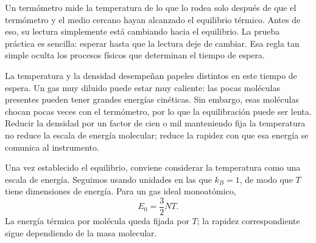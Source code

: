 Un termómetro mide la temperatura de lo que lo rodea solo después de que el termómetro y el medio cercano hayan alcanzado el equilibrio térmico. Antes de eso, su lectura simplemente está cambiando hacia el equilibrio. La prueba práctica es sencilla: esperar hasta que la lectura deje de cambiar. Esa regla tan simple oculta los procesos físicos que determinan el tiempo de espera.

\begin{classroomqa}\end{classroomqa}

La temperatura y la densidad desempeñan papeles distintos en este tiempo de espera. Un gas muy diluido puede estar muy caliente: las pocas moléculas presentes pueden tener grandes energías cinéticas. Sin embargo, esas moléculas chocan pocas veces con el termómetro, por lo que la equilibración puede ser lenta. Reducir la densidad por un factor de cien o mil manteniendo fija la temperatura no reduce la escala de energía molecular; reduce la rapidez con que esa energía se comunica al instrumento.

\begin{classroomqa}\end{classroomqa}

Una vez establecido el equilibrio, conviene considerar la temperatura como una escala de energía. Seguimos usando unidades en las que \(k_B=1\), de modo que \(T\) tiene dimensiones de energía. Para un gas ideal monoatómico, \begin{equation}
 E_0=\frac{3}{2}NT.
 \label{eq:sm6-ideal-energy}
\end{equation} La energía térmica por molécula queda fijada por \(T\); la rapidez correspondiente sigue dependiendo de la masa molecular.

